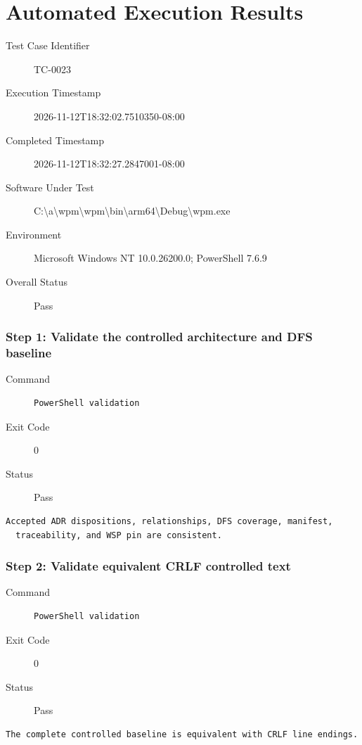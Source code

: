 \section*{Automated Execution Results}
\begin{description}
\item[Test Case Identifier] TC-0023
\item[Execution Timestamp] 2026-11-12T18:32:02.7510350-08:00
\item[Completed Timestamp] 2026-11-12T18:32:27.2847001-08:00
\item[Software Under Test] C:\textbackslash{}a\textbackslash{}wpm\textbackslash{}wpm\textbackslash{}bin\textbackslash{}arm64\textbackslash{}Debug\textbackslash{}wpm.exe
\item[Environment] Microsoft Windows NT 10.0.26200.0; PowerShell 7.6.9
\item[Overall Status] Pass
\end{description}
\subsubsection*{Step 1: Validate the controlled architecture and DFS baseline}
\begin{description}
\item[Command] \mbox{}
\begin{verbatim}
PowerShell validation
\end{verbatim}
\item[Exit Code] 0
\item[Status] Pass
\end{description}
\begin{verbatim}
Accepted ADR dispositions, relationships, DFS coverage, manifest,
  traceability, and WSP pin are consistent.
\end{verbatim}
\subsubsection*{Step 2: Validate equivalent CRLF controlled text}
\begin{description}
\item[Command] \mbox{}
\begin{verbatim}
PowerShell validation
\end{verbatim}
\item[Exit Code] 0
\item[Status] Pass
\end{description}
\begin{verbatim}
The complete controlled baseline is equivalent with CRLF line endings.
\end{verbatim}

